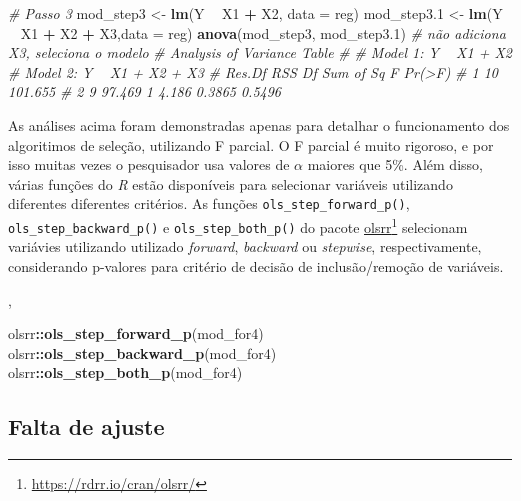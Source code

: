 \documentclass[
]{book}
\newenvironment{Shaded}{\begin{snugshade}}{\end{snugshade}}
\newcommand{\CommentTok}[1]{\textcolor[rgb]{0.56,0.35,0.01}{\textit{#1}}}
\newcommand{\DataTypeTok}[1]{\textcolor[rgb]{0.13,0.29,0.53}{#1}}
\newcommand{\FloatTok}[1]{\textcolor[rgb]{0.00,0.00,0.81}{#1}}
\newcommand{\KeywordTok}[1]{\textcolor[rgb]{0.13,0.29,0.53}{\textbf{#1}}}
\newcommand{\NormalTok}[1]{#1}
\newcommand{\OperatorTok}[1]{\textcolor[rgb]{0.81,0.36,0.00}{\textbf{#1}}}
\newcommand{\StringTok}[1]{\textcolor[rgb]{0.31,0.60,0.02}{#1}}
\begin{document}
\begin{Shaded}
\begin{Highlighting}[]
\CommentTok{# Passo 3}
\NormalTok{mod_step3 <-}\StringTok{ }\KeywordTok{lm}\NormalTok{(Y }\OperatorTok{~}\StringTok{ }\NormalTok{X1 }\OperatorTok{+}\StringTok{ }\NormalTok{X2, }\DataTypeTok{data =}\NormalTok{ reg)}
\NormalTok{mod_step3}\FloatTok{.1}\NormalTok{ <-}\StringTok{ }\KeywordTok{lm}\NormalTok{(Y }\OperatorTok{~}\StringTok{ }\NormalTok{X1 }\OperatorTok{+}\StringTok{ }\NormalTok{X2 }\OperatorTok{+}\StringTok{ }\NormalTok{X3,}\DataTypeTok{data =}\NormalTok{ reg)}
\KeywordTok{anova}\NormalTok{(mod_step3, mod_step3}\FloatTok{.1}\NormalTok{) }\CommentTok{# não adiciona X3, seleciona o modelo}
\CommentTok{# Analysis of Variance Table}
\CommentTok{# }
\CommentTok{# Model 1: Y ~ X1 + X2}
\CommentTok{# Model 2: Y ~ X1 + X2 + X3}
\CommentTok{#   Res.Df     RSS Df Sum of Sq      F Pr(>F)}
\CommentTok{# 1     10 101.655                           }
\CommentTok{# 2      9  97.469  1     4.186 0.3865 0.5496}
\end{Highlighting}
\end{Shaded}

As análises acima foram demonstradas apenas para detalhar o funcionamento dos algoritimos de seleção, utilizando F parcial. O F parcial é muito rigoroso, e por isso muitas vezes o pesquisador usa valores de \(\alpha\) maiores que 5\%. Além disso, várias funções do \emph{R} estão disponíveis para selecionar variáveis utilizando diferentes diferentes critérios. As funções \texttt{ols\_step\_forward\_p()}, \texttt{ols\_step\_backward\_p()} e \texttt{ols\_step\_both\_p()} do pacote \href{https://rdrr.io/cran/olsrr/}{olsrr}\footnote{\url{https://rdrr.io/cran/olsrr/}} selecionam variávies utilizando utilizado \emph{forward}, \emph{backward} ou \emph{stepwise}, respectivamente, considerando p-valores para critério de decisão de inclusão/remoção de variáveis.

, 

\begin{Shaded}
\begin{Highlighting}[]
\NormalTok{olsrr}\OperatorTok{::}\KeywordTok{ols_step_forward_p}\NormalTok{(mod_for4)}
\NormalTok{olsrr}\OperatorTok{::}\KeywordTok{ols_step_backward_p}\NormalTok{(mod_for4)}
\NormalTok{olsrr}\OperatorTok{::}\KeywordTok{ols_step_both_p}\NormalTok{(mod_for4)}
\end{Highlighting}
\end{Shaded}

\hypertarget{falta-de-ajuste}{%
\subsection{Falta de ajuste}\label{falta-de-ajuste}}
\end{document}
